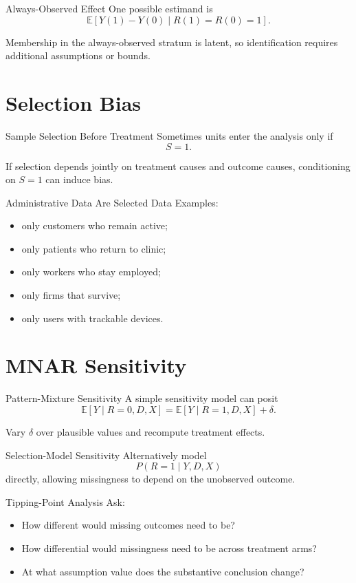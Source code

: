 \documentclass[aspectratio=169,11pt]{beamer}
\newcommand{\E}{\mathbb{E}}
\begin{document}
\begin{frame}{Always-Observed Effect}
One possible estimand is
\[
\E[Y(1)-Y(0)\mid R(1)=R(0)=1].
\]

Membership in the always-observed stratum is latent, so identification requires additional assumptions or bounds.
\end{frame}

\section{Selection Bias}

\begin{frame}{Sample Selection Before Treatment}
Sometimes units enter the analysis only if
\[
S=1.
\]

If selection depends jointly on treatment causes and outcome causes, conditioning on \(S=1\) can induce bias.
\end{frame}

\begin{frame}{Administrative Data Are Selected Data}
Examples:
\begin{itemize}
\item only customers who remain active;
\item only patients who return to clinic;
\item only workers who stay employed;
\item only firms that survive;
\item only users with trackable devices.
\end{itemize}
\end{frame}

\section{MNAR Sensitivity}

\begin{frame}{Pattern-Mixture Sensitivity}
A simple sensitivity model can posit
\[
\E[Y\mid R=0,D,X]
=
\E[Y\mid R=1,D,X]
+
\delta.
\]

Vary \(\delta\) over plausible values and recompute treatment effects.
\end{frame}

\begin{frame}{Selection-Model Sensitivity}
Alternatively model
\[
P(R=1\mid Y,D,X)
\]
directly, allowing missingness to depend on the unobserved outcome.
\end{frame}

\begin{frame}{Tipping-Point Analysis}
Ask:
\begin{itemize}
\item How different would missing outcomes need to be?
\item How differential would missingness need to be across treatment arms?
\item At what assumption value does the substantive conclusion change?
\end{itemize}
\end{frame}
\end{document}
